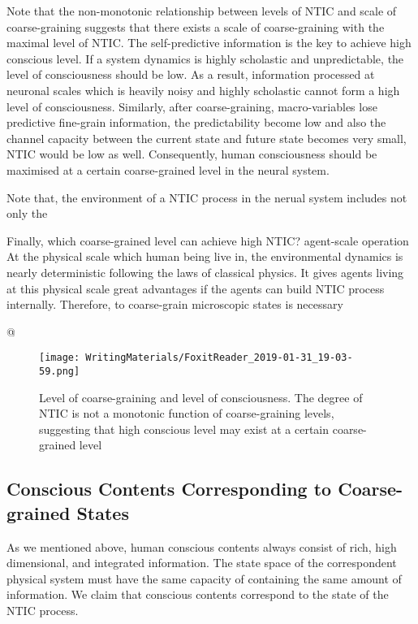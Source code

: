 		Note that the non-monotonic relationship between levels of NTIC and scale of coarse-graining suggests that there exists a scale of coarse-graining with the maximal level of NTIC. The self-predictive information is the key to achieve high conscious level. If a system dynamics is highly scholastic and unpredictable, the level of consciousness should be low. As a result, information processed at neuronal scales which is heavily noisy and highly scholastic cannot form a high level of consciousness. Similarly, after coarse-graining, macro-variables lose predictive fine-grain information, the predictability become low and also the channel capacity between the current state and future state becomes very small, NTIC would be low as well. Consequently, human consciousness should be maximised at a certain coarse-grained level in the neural system. 
		
		Note that, the environment of a NTIC process in the nerual system includes not only the
		
		Finally, which coarse-grained level can achieve high NTIC? 
		agent-scale operation
		At the physical scale which human being live in, the environmental dynamics is nearly deterministic following the laws of classical physics. It gives agents living at this physical scale great advantages if the agents can build NTIC process internally. Therefore, to coarse-grain microscopic states is necessary
		
		
		\begin{ants}
			
			@ 
			
				\begin{figure}[H]				
				\texttt{[image: WritingMaterials/FoxitReader\_2019-01-31\_19-03-59.png]}
				\label{fig:LevelOfConsciousness}
				\caption{Level of coarse-graining and level of consciousness. The degree of NTIC is not a monotonic function of coarse-graining levels, suggesting that high conscious level may exist at a certain coarse-grained level }
				\end{figure}
		\end{ants}

\rlend
{}
		\subsection{Conscious Contents Corresponding to Coarse-grained States}
		As we mentioned above, human conscious contents always consist of rich,  high dimensional, and integrated information. The state space of the correspondent physical system must have the same capacity of containing the same amount of information. We claim that conscious contents correspond to the state of the NTIC process. 
		
